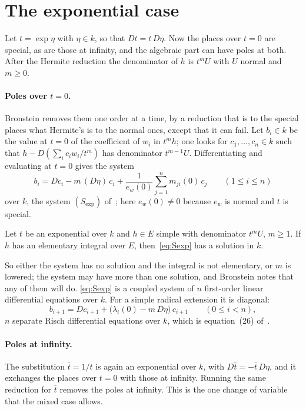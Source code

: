 \section{The exponential case}\label{sec:elem-exp}

Let $t = \exp \eta$ with $\eta \in k$, so that $Dt = t\, D\eta$. Now the
places over $t = 0$ are special, as are those at infinity, and the algebraic
part can have poles at both. After the Hermite reduction the denominator of
$h$ is $t^m U$ with $U$ normal and $m \ge 0$.

\paragraph{Poles over $t = 0$.} Bronstein removes them one order at a time,
by a reduction that is to the special places what Hermite's is to the normal
ones, except that it can fail. Let $b_i \in k$ be the value at $t = 0$ of the coefficient of $w_i$ in $t^m
h$; one looks for $c_1, \dots, c_n \in k$ such that $h - D(\sum_i c_i w_i /
t^m)$ has denominator $t^{m-1} U$. Differentiating and evaluating at $t = 0$
gives the system
\begin{equation}\label{eq:Sexp}
  b_i = Dc_i - m\, (D\eta)\, c_i + \frac{1}{e_w(0)} \sum_{j=1}^n m_{ji}(0)\, c_j
  \qquad (1 \le i \le n)
\end{equation}
over $k$, the system $(S_{\exp})$ of~\cite[\S2]{bronstein1990}; here $e_w(0)
\ne 0$ because $e_w$ is normal and $t$ is special.

\begin{theorem}\label{thm:exp-reduction}
Let $t$ be an exponential over $k$ and $h \in E$ simple with denominator $t^m
U$, $m \ge 1$. If $h$ has an elementary integral over $E$,
then~\eqref{eq:Sexp} has a solution in $k$.
\end{theorem}

So either the system has no solution and the integral is not elementary, or
$m$ is lowered; the system may have more than one solution, and Bronstein
notes that any of them will do. \eqref{eq:Sexp} is a coupled system of $n$ first-order linear
differential equations over $k$. For a simple radical extension it is
diagonal:
\[
  b_{i+1} = Dc_{i+1} + \bigl( \lambda_i(0) - m\, D\eta \bigr)\, c_{i+1}
  \qquad (0 \le i < n),
\]
$n$ separate Risch differential equations over $k$, which is
equation~(26) of~\cite[\S3.9]{bronstein1998tutorial}.

\paragraph{Poles at infinity.} The substitution $\bar t = 1/t$ is again an
exponential over $k$, with $D\bar t = -\bar t\, D\eta$, and it exchanges the
places over $t = 0$ with those at infinity. Running the same reduction for
$\bar t$ removes the poles at infinity. This is the one change of variable
that the mixed case allows.

